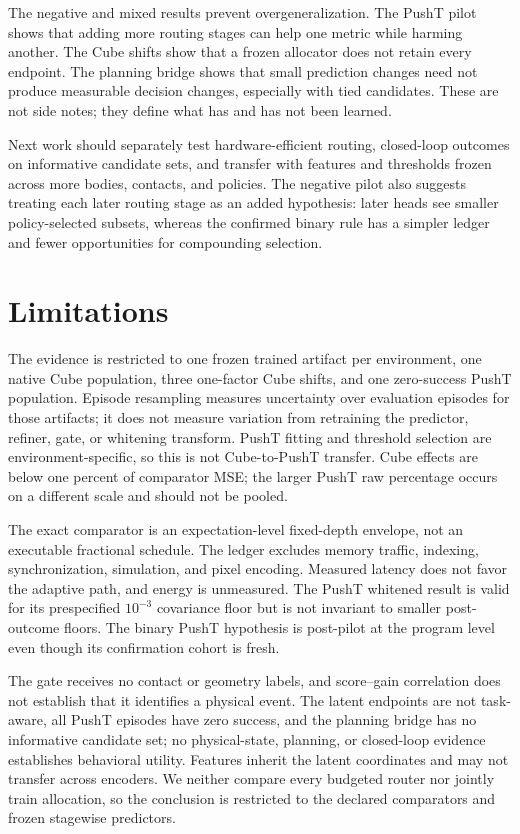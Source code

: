 \documentclass{article}
\begin{document}
The negative and mixed results prevent overgeneralization. The PushT pilot shows that adding more routing stages can help one metric while harming another. The Cube shifts show that a frozen allocator does not retain every endpoint. The planning bridge shows that small prediction changes need not produce measurable decision changes, especially with tied candidates. These are not side notes; they define what has and has not been learned.

Next work should separately test hardware-efficient routing, closed-loop outcomes on informative candidate sets, and transfer with features and thresholds frozen across more bodies, contacts, and policies. The negative pilot also suggests treating each later routing stage as an added hypothesis: later heads see smaller policy-selected subsets, whereas the confirmed binary rule has a simpler ledger and fewer opportunities for compounding selection.

\section{Limitations}

The evidence is restricted to one frozen trained artifact per environment, one native Cube population, three one-factor Cube shifts, and one zero-success PushT population. Episode resampling measures uncertainty over evaluation episodes for those artifacts; it does not measure variation from retraining the predictor, refiner, gate, or whitening transform. PushT fitting and threshold selection are environment-specific, so this is not Cube-to-PushT transfer. Cube effects are below one percent of comparator MSE; the larger PushT raw percentage occurs on a different scale and should not be pooled.

The exact comparator is an expectation-level fixed-depth envelope, not an executable fractional schedule. The ledger excludes memory traffic, indexing, synchronization, simulation, and pixel encoding. Measured latency does not favor the adaptive path, and energy is unmeasured. The PushT whitened result is valid for its prespecified \(10^{-3}\) covariance floor but is not invariant to smaller post-outcome floors. The binary PushT hypothesis is post-pilot at the program level even though its confirmation cohort is fresh.

The gate receives no contact or geometry labels, and score--gain correlation does not establish that it identifies a physical event. The latent endpoints are not task-aware, all PushT episodes have zero success, and the planning bridge has no informative candidate set; no physical-state, planning, or closed-loop evidence establishes behavioral utility. Features inherit the latent coordinates and may not transfer across encoders. We neither compare every budgeted router nor jointly train allocation, so the conclusion is restricted to the declared comparators and frozen stagewise predictors.
\end{document}
